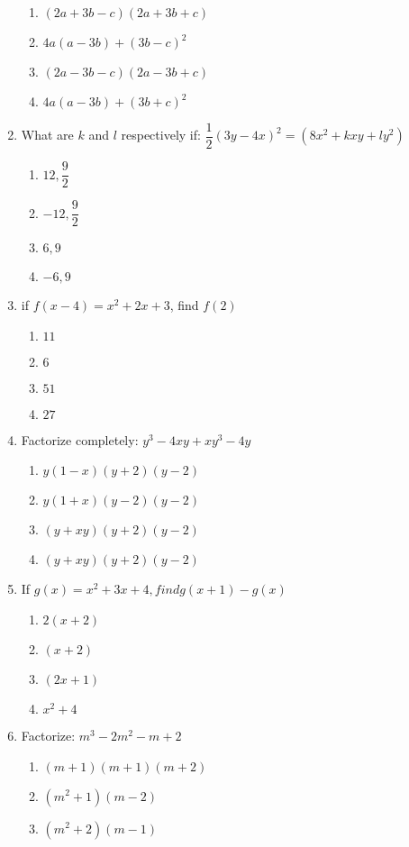 \begin{multicols}{2}
\begin{enumerate}[label={\arabic*.}]
	\begin{enumerate}[label={\Alph*.}]
	\item \((2a+3b-c)(2a+3b+c)\)
	\item \(4a(a-3b)+(3b-c)^2\)
	\item \((2a-3b-c)(2a-3b+c)\)
	\item \(4a(a-3b) + (3b+c)^2\)
	\end{enumerate}
\item What are \(k\) and \(l\) respectively if: \(\dfrac{1}{2}(3y-4x)^2 = (8x^2+kxy+ly^2)\)
	\begin{enumerate}[label={\Alph*.}]
	\item \(12, \dfrac{9}{2}\)
	\item \(-12, \dfrac{9}{2}\)
	\item \(6, 9\)
	\item \(-6, 9\)
	\end{enumerate}
\item if \(f(x-4) = x^2+2x+3\), find \(f(2)\)
	\begin{enumerate}[label={\Alph*.}]
	\item \(11\)
	\item \(6\)
	\item \(51\)
	\item \(27\)
	\end{enumerate}
\item Factorize completely: \(y^3-4xy+xy^3-4y\)
	\begin{enumerate}[label={\Alph*.}]
	\item \(y(1-x)(y+2)(y-2)\)
	\item \(y(1+x)(y-2)(y-2)\)
	\item \((y+xy)(y+2)(y-2)\)
	\item \((y+xy)(y+2)(y-2)\)
	\end{enumerate}
\item If \(g(x) = x^2+3x+4, find g(x+1) -g(x)\)
	\begin{enumerate}[label={\Alph*.}]
	\item \(2(x+2)\)
	\item \((x+2)\)
	\item \((2x+1)\)
	\item \(x^2+4\)
	\end{enumerate}
\item Factorize: \(m^3-2m^2-m+2\)
	\begin{enumerate}[label={\Alph*.}]
	\item \((m+1)(m+1)(m+2)\)
	\item \((m^2+1)(m-2)\)
	\item \((m^2+2)(m-1)\)

\end{enumerate}
\end{enumerate}
\end{multicols}
